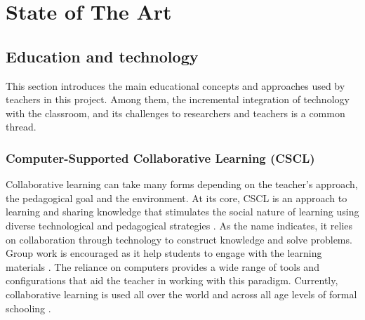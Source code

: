 \normallinespacing

\chapter{State of The Art}
\section{Education and technology}
This section introduces the main educational concepts and approaches used by teachers in this project. Among them, the incremental integration of technology with the classroom, and its challenges to researchers and teachers is a common thread.
\subsection{Computer-Supported Collaborative Learning (CSCL)}
Collaborative learning can take many forms depending on the teacher's approach, the pedagogical goal and the environment. At its core, CSCL is an approach to learning and sharing knowledge that stimulates the social nature of learning using diverse technological and pedagogical strategies \cite{Dillenbourg2009-jl}. As the name indicates, it relies on collaboration through technology to construct knowledge and solve problems. Group work is encouraged as it help students to engage with the learning materials \cite{Bonwell1991-sl}. The reliance on computers provides a wide range of tools and configurations that aid the teacher in working with this paradigm. Currently, collaborative learning is used all over the world and across all age levels of formal schooling \cite{Jeong2019-ul}.

